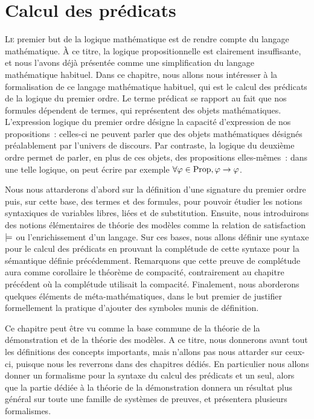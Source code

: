 \chapter{Calcul des prédicats}
\label{chp.logpred}

\minitoc

\lettrine{L}{e} premier but de la logique mathématique est de rendre compte du
langage mathématique. \`A ce titre, la logique propositionnelle est clairement
insuffisante, et nous l'avons déjà présentée comme une simplification du langage
mathématique habituel. Dans ce chapitre, nous allons nous intéresser à la
formalisation de ce langage mathématique habituel, qui est le calcul des
prédicats de la logique du premier ordre. Le terme prédicat se rapport au fait
que nos formules dépendent de termes, qui représentent des objets mathématiques.
L'expression \og logique du premier ordre\fg{} désigne la capacité d'expression
de nos propositions~: celles-ci ne peuvent parler que des objets mathématiques
désignés préalablement par l'univers de discours. Par contraste, la logique du
deuxième ordre permet de parler, en plus de ces objets, des propositions
elles-mêmes~: dans une telle logique, on peut écrire par exemple
$\forall \varphi\in\operatorname{Prop}, \varphi\to \varphi$.

Nous nous attarderons d'abord sur la définition d'une signature du
premier ordre puis, sur cette base, des termes et des formules, pour
pouvoir étudier les notions syntaxiques de
variables libres, liées et de substitution. Ensuite, nous introduirons des
notions élémentaires de théorie des modèles comme la relation de
satisfaction $\models$ ou l'enrichissement d'un langage.
Sur ces bases, nous allons
définir une syntaxe pour le calcul des prédicats en prouvant la complétude de
cette syntaxe pour la sémantique définie précédemment. Remarquons que cette
preuve de complétude aura comme corollaire le théorème de compacité,
contrairement au chapitre précédent où la complétude utilisait la compacité.
Finalement, nous aborderons quelques éléments de méta-mathématiques, dans le but
premier de justifier formellement la pratique d'ajouter des symboles munis de
définition.

Ce chapitre peut être vu comme la base commune de la théorie de la démonstration
et de la théorie des modèles. A ce titre, nous donnerons avant tout les
définitions des concepts importants, mais n'allons pas nous attarder sur
ceux-ci, puisque nous les reverrons dans des chapitres dédiés. En particulier
nous allons donner un formalisme pour la syntaxe du calcul des prédicats et un
seul, alors que la partie dédiée à la théorie de la démonstration donnera un
résultat plus général sur toute une famille de systèmes de preuves, et
présentera plusieurs formalismes.


